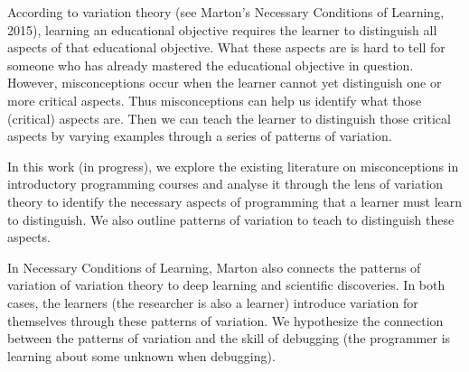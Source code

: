 According to variation theory (see Marton's Necessary Conditions of
Learning, 2015), learning an educational objective requires the learner to 
distinguish all aspects of that educational objective. What these aspects are 
is hard to tell for someone who has already mastered the educational objective 
in question. However, misconceptions occur when the learner cannot yet 
distinguish one or more critical aspects. Thus misconceptions can help us 
identify what those (critical) aspects are. Then we can teach the learner to 
distinguish those critical aspects by varying examples through a series of 
patterns of variation.

In this work (in progress), we explore the existing literature on 
misconceptions in introductory programming courses and analyse it 
through the lens of variation theory to identify the necessary aspects of 
programming that a learner must learn to distinguish. We also outline patterns 
of variation to teach to distinguish these aspects.

In Necessary Conditions of Learning, Marton also connects the patterns of 
variation of variation theory to deep learning and scientific discoveries. In 
both cases, the learners (the researcher is also a learner) introduce variation 
for themselves through these patterns of variation. We hypothesize the 
connection between the patterns of variation and the skill of debugging (the 
programmer is learning about some unknown when debugging).
